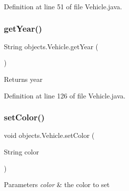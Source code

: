 Definition at line 51 of file Vehicle.\+java.


\begin{DoxyCode}{0}

\end{DoxyCode}
\mbox{\label{classobjects_1_1_vehicle_a0bc2ece5d4fd0087741111f6fd8ea3b8}} 
\subsubsection{\texorpdfstring{getYear()}{getYear()}}
{\footnotesize\ttfamily String objects.\+Vehicle.\+get\+Year (\begin{DoxyParamCaption}{ }\end{DoxyParamCaption})}

\begin{DoxyReturn}{Returns}
year 
\end{DoxyReturn}


Definition at line 126 of file Vehicle.\+java.


\begin{DoxyCode}{0}

\end{DoxyCode}
\mbox{\label{classobjects_1_1_vehicle_a252cad922969a207043e7cb49db241fa}} 
\subsubsection{\texorpdfstring{setColor()}{setColor()}}
{\footnotesize\ttfamily void objects.\+Vehicle.\+set\+Color (\begin{DoxyParamCaption}\item[{String}]{color }\end{DoxyParamCaption})}


\begin{DoxyParams}{Parameters}
{\em color} & the color to set \\
\hline
\end{DoxyParams}


